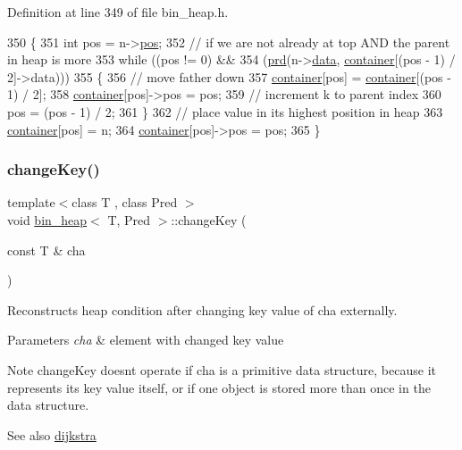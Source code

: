 Definition at line 349 of file bin\+\_\+heap.\+h.


\begin{DoxyCode}
350 \{
351     \textcolor{keywordtype}{int} pos = n->\mbox{\hyperlink{classheap__node_a6d6ebca320ede4a2dc3749caf0519534}{pos}};
352     \textcolor{comment}{// if we are not already at top AND the parent in heap is more}
353     \textcolor{keywordflow}{while} ((pos != 0) &&
354        (\mbox{\hyperlink{classbin__heap_a5ecc420dfd03a6a0b4c9328cac1fae14}{prd}}(n->\mbox{\hyperlink{classheap__node_ae37815e49df4d367e28ca4615b40e397}{data}}, \mbox{\hyperlink{classbin__heap_a413200f4c6e24090c5e9a32184fc8857}{container}}[(pos - 1) / 2]->data)))
355     \{
356     \textcolor{comment}{// move father down}
357     \mbox{\hyperlink{classbin__heap_a413200f4c6e24090c5e9a32184fc8857}{container}}[pos] = \mbox{\hyperlink{classbin__heap_a413200f4c6e24090c5e9a32184fc8857}{container}}[(pos - 1) / 2];
358     \mbox{\hyperlink{classbin__heap_a413200f4c6e24090c5e9a32184fc8857}{container}}[pos]->pos = pos;
359     \textcolor{comment}{// increment k to parent index}
360     pos = (pos - 1) / 2;
361     \}
362     \textcolor{comment}{// place value in its highest position in heap}
363     \mbox{\hyperlink{classbin__heap_a413200f4c6e24090c5e9a32184fc8857}{container}}[pos] = n;
364     \mbox{\hyperlink{classbin__heap_a413200f4c6e24090c5e9a32184fc8857}{container}}[pos]->pos = pos;
365 \}
\end{DoxyCode}
\mbox{\label{classbin__heap_ab1353fe40c5cfc1205314a4db6334f1b}} 
\subsubsection{\texorpdfstring{change\+Key()}{changeKey()}}
{\footnotesize\ttfamily template$<$class T , class Pred $>$ \\
void \mbox{\hyperlink{classbin__heap}{bin\+\_\+heap}}$<$ T, Pred $>$\+::change\+Key (\begin{DoxyParamCaption}\item[{const T \&}]{cha }\end{DoxyParamCaption})}



Reconstructs heap condition after changing key value of {\ttfamily cha} externally. 


\begin{DoxyParams}{Parameters}
{\em cha} & element with changed key value\\
\hline
\end{DoxyParams}
\begin{DoxyNote}{Note}
{\ttfamily change\+Key} doesn\textquotesingle{}t operate if {\ttfamily cha} is a primitive data structure, because it represents its key value itself, or if one object is stored more than once in the data structure.
\end{DoxyNote}
\begin{DoxySeeAlso}{See also}
\mbox{\hyperlink{classdijkstra}{dijkstra}} 
\end{DoxySeeAlso}


